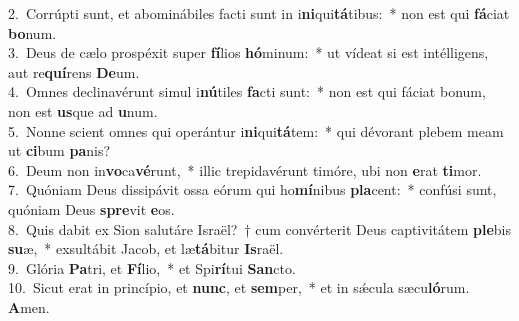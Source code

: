 {2.~}Corrúpti sunt, et abominábiles facti sunt in i\textbf{ni}qui\textbf{tá}tibus:~* non est qui \textbf{fá}ciat \textbf{bo}num.\\
{3.~}Deus de cælo prospéxit super \textbf{fí}lios \textbf{hó}minum:~* ut vídeat si est intélligens, aut re\textbf{quí}rens \textbf{De}um.\\
{4.~}Omnes declinavérunt simul i\textbf{nú}tiles \textbf{fa}cti sunt:~* non est qui fáciat bonum, non est \textbf{us}que ad \textbf{u}num.\\
{5.~}Nonne scient omnes qui operántur i\textbf{ni}qui\textbf{tá}tem:~* qui dévorant plebem meam ut \textbf{ci}bum \textbf{pa}nis?\\
{6.~}Deum non in\textbf{vo}ca\textbf{vé}runt,~* illic trepidavérunt timóre, ubi non \textbf{e}rat \textbf{ti}mor.\\
{7.~}Quóniam Deus dissipávit ossa eórum qui ho\textbf{mí}nibus \textbf{pla}cent:~* confúsi sunt, quóniam Deus \textbf{spre}vit \textbf{e}os.\\
{8.~}Quis dabit ex Sion salutáre Israël?~† cum convérterit Deus captivitátem \textbf{ple}bis \textbf{su}æ,~* exsultábit Jacob, et læ\textbf{tá}bitur \textbf{Is}raël.\\
{9.~}Glória \textbf{Pa}tri, et \textbf{Fí}lio,~* et Spi\textbf{rí}tui \textbf{San}cto.\\
{10.~}Sicut erat in princípio, et \textbf{nunc}, et \textbf{sem}per,~* et in sǽcula sæcu\textbf{ló}rum. \textbf{A}men.\\
